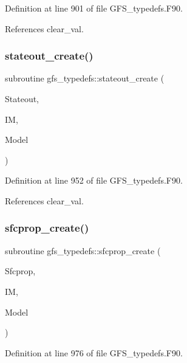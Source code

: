 Definition at line 901 of file G\+F\+S\+\_\+typedefs.\+F90.



References clear\+\_\+val.

\mbox{\label{namespacegfs__typedefs_a87019826e2dccdd5d55f84aed2ad2f8c}} 
\subsubsection{stateout\+\_\+create()}
{\footnotesize\ttfamily subroutine gfs\+\_\+typedefs\+::stateout\+\_\+create (\begin{DoxyParamCaption}\item[{class(\textbf{ gfs\+\_\+stateout\+\_\+type})}]{Stateout,  }\item[{integer, intent(in)}]{IM,  }\item[{type(\textbf{ gfs\+\_\+control\+\_\+type}), intent(in)}]{Model }\end{DoxyParamCaption})}



Definition at line 952 of file G\+F\+S\+\_\+typedefs.\+F90.



References clear\+\_\+val.

\mbox{\label{namespacegfs__typedefs_ab3179d5631ba9eedb672e15f2c736fdb}} 
\subsubsection{sfcprop\+\_\+create()}
{\footnotesize\ttfamily subroutine gfs\+\_\+typedefs\+::sfcprop\+\_\+create (\begin{DoxyParamCaption}\item[{class(\textbf{ gfs\+\_\+sfcprop\+\_\+type})}]{Sfcprop,  }\item[{integer, intent(in)}]{IM,  }\item[{type(\textbf{ gfs\+\_\+control\+\_\+type}), intent(in)}]{Model }\end{DoxyParamCaption})}



Definition at line 976 of file G\+F\+S\+\_\+typedefs.\+F90.



